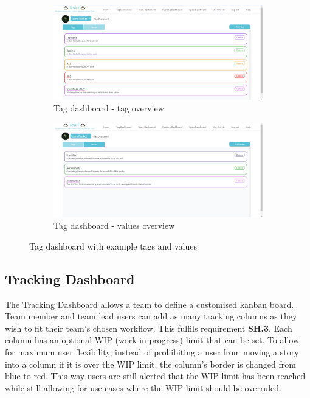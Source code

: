 \documentclass[l4proj.tex]{subfiles}
\begin{document}
\begin{figure}[h!]
\centering
\begin{subfigure}{.5\textwidth}
\centering
\includegraphics[scale=0.17]{dissertation/images/TagDashboardOne.png}
\caption{Tag dashboard - tag overview}
\end{subfigure}%
\begin{subfigure}{.5\textwidth}
\centering
\includegraphics[scale=0.17]{dissertation/images/TagDashboardTwo.png}
\caption{Tag dashboard - values overview}
\end{subfigure}

\caption{Tag dashboard with example tags and values}
\label{fig:tag dashboard}
\end{figure}

\subsection{Tracking Dashboard}
The Tracking Dashboard allows a team to define a customised kanban board. Team member and team lead users can add as many tracking columns as they wish to fit their team's chosen workflow. This fulfils requirement \textbf{SH.3}. Each column has an optional WIP (work in progress) limit that can be set. To allow for maximum user flexibility, instead of prohibiting a user from moving a story into a column if it is over the WIP limit, the column's border is changed from blue to red. This way users are still alerted that the WIP limit has been reached while still allowing for use cases where the WIP limit should be overruled.
\end{document}
